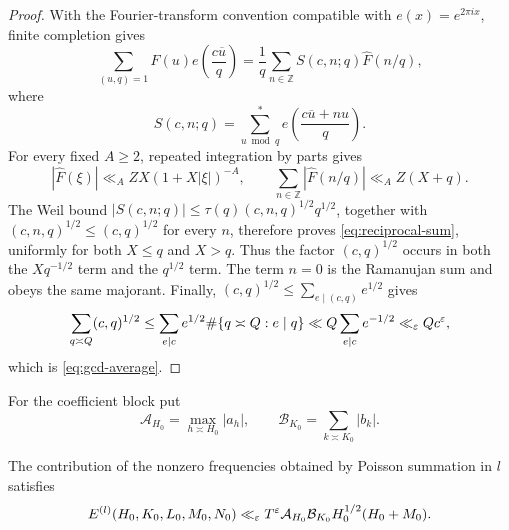 \begin{proof}
With the Fourier-transform convention compatible with $e(x)=e^{2\pi ix}$,
finite completion gives
\[
 \sum_{(u,q)=1}F(u)e\!\left(\frac{c\overline u}{q}\right)
 =\frac1q\sum_{n\in\mathbb Z}S(c,n;q)\widehat F(n/q),
\]
where
\[
 S(c,n;q)=\sum_{u\bmod q}^{*}
 e\!\left(\frac{c\overline u+nu}{q}\right).
\]
For every fixed $A\geq2$, repeated integration by parts gives
\[
 |\widehat F(\xi)|\ll_A ZX(1+X|\xi|)^{-A},
 \qquad
 \sum_{n\in\mathbb Z}|\widehat F(n/q)|\ll_A Z(X+q).
\]
The Weil bound
$|S(c,n;q)|\leq\tau(q)(c,n,q)^{1/2}q^{1/2}$, together with
$(c,n,q)^{1/2}\leq(c,q)^{1/2}$ for every $n$, therefore proves
\eqref{eq:reciprocal-sum}, uniformly for both $X\leq q$ and $X>q$.
Thus the factor $(c,q)^{1/2}$ occurs in both the $Xq^{-1/2}$ term and the
$q^{1/2}$ term.  The term $n=0$ is the Ramanujan sum and obeys the same
majorant.  Finally,
$(c,q)^{1/2}\leq\sum_{e\mid(c,q)}e^{1/2}$ gives
\[
 \sum_{q\asymp Q}(c,q)^{1/2}
 \leq\sum_{e\mid c}e^{1/2}\#\{q\asymp Q:e\mid q\}
 \ll Q\sum_{e\mid c}e^{-1/2}\ll_\varepsilon Qc^\varepsilon,
\]
which is \eqref{eq:gcd-average}.
\end{proof}

For the coefficient block put
\begin{equation}\label{eq:coefficient-block-norms}
 \mathcal A_{H_0}=\max_{h\asymp H_0}|a_h|,
 \qquad
 \mathcal B_{K_0}=\sum_{k\asymp K_0}|b_k|.
\end{equation}

\begin{proposition}
\label{prop:block-weil}
The contribution of the nonzero frequencies obtained by Poisson summation in
$l$ satisfies
\begin{equation}\label{eq:block-weil}
 E^{(l)}(H_0,K_0,L_0,M_0,N_0)
 \ll_\varepsilon T^\varepsilon\mathcal A_{H_0}\mathcal B_{K_0}
 H_0^{1/2}(H_0+M_0).
\end{equation}
\end{proposition}

